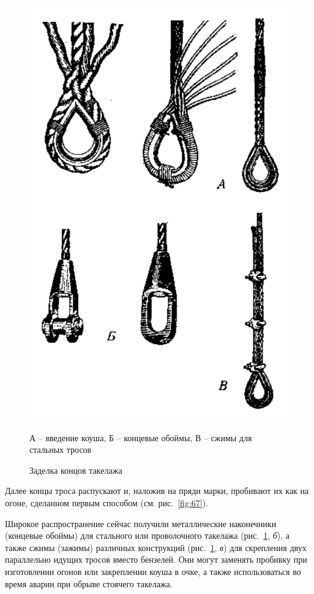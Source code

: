 \documentclass[a4paper, 12pt, twoside, final]{scrbook}
\begin{document}
\begin{figure}[htbp]
   \centering
   \includegraphics{68_Zadelka_koncov_takelazha} %
   \caption{Заделка концов такелажа}
   \label{fig:68}
   \centering\small
   А \--- введение коуша, Б \--- концевые обоймы, В \--- сжимы для стальных тросов
\end{figure}

Далее концы троса распускают и, наложив на пряди марки, пробивают их как на огоне, сделанном первым способом (см. рис.~\ref{fig:67}). 

Широкое распространение сейчас получили металлические наконечники (концевые обоймы) для стального или проволочного такелажа (рис.~\ref{fig:68}, \textit{б}), а также сжимы (зажимы) различных конструкций (рис.~\ref{fig:68}, \textit{в}) для скрепления двух параллельно идущих тросов вместо бензелей. Они могут заменять пробивку при изготовлении огонов или закреплении коуша в очке, а также использоваться во время аварии при обрыве стоячего такелажа.
\end{document}
